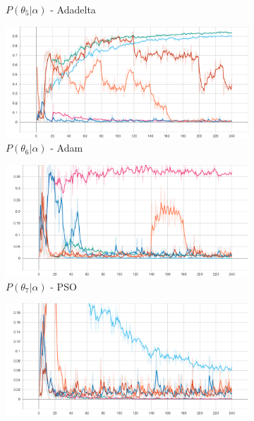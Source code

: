 \begin{figure}[htbp]
\begin{subfigure}{0.5\textwidth}
        \caption{$P(\theta_{5} | \alpha)$ - \Acs{Adadelta}}
        \label{fig:results:case_study:iris:p_theta:5}
    \end{subfigure}
    \par\medskip
    \begin{subfigure}{0.5\textwidth}
        \centering
        \includegraphics[width=\textwidth]{analysis/bhh_case_study/iris/theta[6].png}
        \caption{$P(\theta_{6} | \alpha)$ - \Acs{Adam}}
        \label{fig:results:case_study:iris:p_theta:6}
    \end{subfigure}
    \begin{subfigure}{0.5\textwidth}
        \centering
        \includegraphics[width=\textwidth]{analysis/bhh_case_study/iris/theta[7].png}
        \caption{$P(\theta_{7} | \alpha)$ - \Acs{PSO}}
        \label{fig:results:case_study:iris:p_theta:7}
    \end{subfigure}
    \par\medskip
    \begin{subfigure}{0.5\textwidth}
        \centering
        \includegraphics[width=\textwidth]{analysis/bhh_case_study/iris/theta[8].png}

\end{subfigure}
\end{figure}
